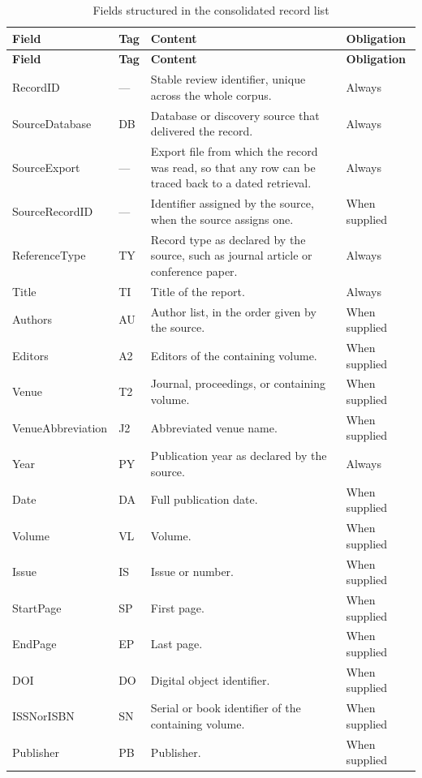 \begin{longtable}{p{} p{} p{} p{}}
\caption{Fields structured in the consolidated record list}
\label{tab:protocol_record_list}\\
\toprule
\textbf{Field} & \textbf{Tag} & \textbf{Content} & \textbf{Obligation} \\
\midrule
\endfirsthead
\toprule
\textbf{Field} & \textbf{Tag} & \textbf{Content} & \textbf{Obligation} \\
\midrule
\endhead
RecordID & --- & Stable review identifier, unique across the whole corpus. & Always \\
SourceDatabase & DB & Database or discovery source that delivered the record. & Always \\
SourceExport & --- & Export file from which the record was read, so that any row can be traced back to a dated retrieval. & Always \\
SourceRecordID & --- & Identifier assigned by the source, when the source assigns one. & When supplied \\
ReferenceType & TY & Record type as declared by the source, such as journal article or conference paper. & Always \\
Title & TI & Title of the report. & Always \\
Authors & AU & Author list, in the order given by the source. & When supplied \\
Editors & A2 & Editors of the containing volume. & When supplied \\
Venue & T2 & Journal, proceedings, or containing volume. & When supplied \\
VenueAbbreviation & J2 & Abbreviated venue name. & When supplied \\
Year & PY & Publication year as declared by the source. & Always \\
Date & DA & Full publication date. & When supplied \\
Volume & VL & Volume. & When supplied \\
Issue & IS & Issue or number. & When supplied \\
StartPage & SP & First page. & When supplied \\
EndPage & EP & Last page. & When supplied \\
DOI & DO & Digital object identifier. & When supplied \\
ISSNorISBN & SN & Serial or book identifier of the containing volume. & When supplied \\
Publisher & PB & Publisher. & When supplied \\

\end{longtable}

